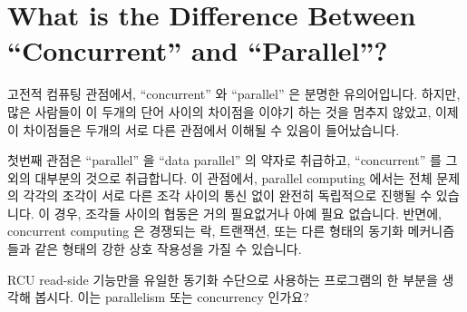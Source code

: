 
\section{What is the Difference Between ``Concurrent'' and ``Parallel''?}
\label{sec:app:questions:What is the Difference Between ``Concurrent'' and ``Parallel''?}

고전적 컴퓨팅 관점에서, ``concurrent'' 와 ``parallel'' 은 분명한 유의어입니다.
하지만, 많은 사람들이 이 두개의 단어 사이의 차이점을 이야기 하는 것을 멈추지
않았고, 이제 이 차이점들은 두개의 서로 다른 관점에서 이해될 수 있음이
들어났습니다.

첫번째 관점은 ``parallel'' 을 ``data parallel'' 의 약자로 취급하고,
``concurrent'' 를 그 외의 대부분의 것으로 취급합니다.
이 관점에서, parallel computing 에서는 전체 문제의 각각의 조각이 서로 다른 조각
사이의 통신 없이 완전히 독립적으로 진행될 수 있습니다.
이 경우, 조각들 사이의 협동은 거의 필요없거나 아예 필요 없습니다.
반면에, concurrent computing 은 경쟁되는 락, 트랜잭션, 또는 다른 형태의 동기화
메커니즘들과 같은 형태의 강한 상호 작용성을 가질 수 있습니다.
\iffalse

From a classic computing perspective, ``concurrent'' and ``parallel''
are clearly synonyms.
However, this has not stopped many people from drawing distinctions
between the two, and it turns out that these distinctions can be
understood from a couple of different perspectives.

The first perspective treats ``parallel'' as an abbreviation for
``data parallel'', and treats ``concurrent'' as pretty much everything
else.
From this perspective, in parallel computing, each partition of the
overall problem can proceed completely independently, with no
communication with other partitions.
In this case, little or no coordination among partitions is required.
In contrast, concurrent computing might well have tight interdependencies,
in the form of contended locks, transactions, or other synchronization
mechanisms.
\fi

\QuickQuiz{}
	RCU read-side 기능만을 유일한 동기화 수단으로 사용하는 프로그램의 한
	부분을 생각해 봅시다.
	이는 parallelism 또는 concurrency 인가요?
	\iffalse

	Suppose a portion of a program uses RCU read-side primitives
	as its only synchronization mechanism.
	Is this parallelism or concurrency?
	\fi
\QuickQuizAnswer{
	그렇습니다.
	\iffalse

	Yes.
	\fi
} \QuickQuizEnd

